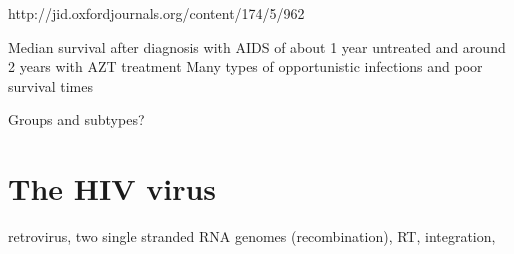 \documentclass[../sherrill-Mix_thesis.tex]{subfiles}
\begin{document}
http://jid.oxfordjournals.org/content/174/5/962


	Median survival after diagnosis with AIDS of about 1 year untreated \citep{Rothenberg1987,Vella1992} and around 2 years with AZT treatment \citep{Creagh-Kirk1988,Fischl1989,Moore1992,Vella1992} Many types of opportunistic infections and poor survival times \citep{Moore1996}

	Groups and subtypes?


	






\section{The HIV virus}
retrovirus, two single stranded RNA genomes (recombination), RT, integration,
\end{document}
